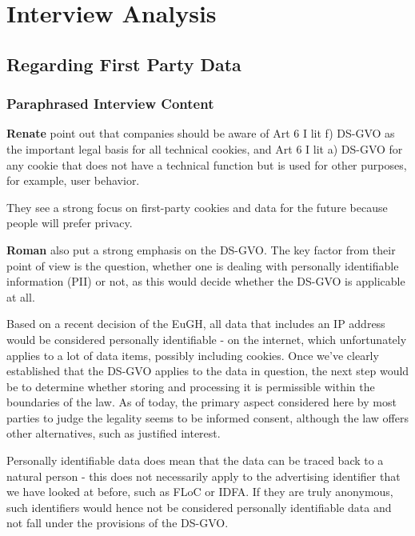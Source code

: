 %
%

\pagebreak
\section{Interview Analysis}

\onehalfspacing

\subsection{Regarding First Party Data}

\subsubsection{Paraphrased Interview Content}

\textbf{Renate} point out that companies should be aware of Art 6 I lit f) DS-GVO as the important legal basis for all technical cookies, and Art 6 I lit a) DS-GVO for any cookie that does not have a technical function but is used for other purposes, for example, user behavior.

They see a strong focus on first-party cookies and data for the future because people will prefer privacy.

\textbf{Roman} also put a strong emphasis on the DS-GVO. The key factor from their point of view is the question, whether one is dealing with personally identifiable information (PII) or not, as this would decide whether the DS-GVO is applicable at all. 

Based on a recent decision of the EuGH, all data that includes an IP address would be considered personally identifiable - on the internet, which unfortunately applies to a lot of data items, possibly including cookies. Once we've clearly established that the DS-GVO applies to the data in question, the next step would be to determine whether storing and processing it is permissible within the boundaries of the law. As of today, the primary aspect considered here by most parties to judge the legality seems to be informed consent, although the law offers other alternatives, such as justified interest.

Personally identifiable data does mean that the data can be traced back to a natural person - this does not necessarily apply to the advertising identifier that we have looked at before, such as FLoC or IDFA. If they are truly anonymous, such identifiers would hence not be considered personally identifiable data and not fall under the provisions of the DS-GVO.

